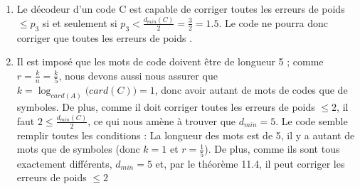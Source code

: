 \documentclass[10p,a4paper]{scrartcl}
\renewcommand{\(}{\left(}
\renewcommand{\)}{\right)}
\begin{document}
\begin{enumerate}
	\item 	Le décodeur d'un code C est capable de corriger toutes les erreurs de poids $\leq p_3$ si et seulement si $p_3 < \frac{d_{min}(C)}{2} = \frac{3}{2} = 1.5$. Le code ne pourra donc corriger que toutes les erreurs de poids .
	
	\item 	Il est imposé que les  mots de code doivent être de longueur 5 ; comme $r = \frac{k}{n} = \frac{k}{5}$, nous devons aussi nous assurer que $k = \log_{card(A)}\big(card(C)\big) = 1$, donc avoir autant de mots de codes que de symboles. De plus, comme il doit corriger toutes les erreurs de poids $\leq 2$, il faut $2 \leq \frac{d_{min}(C)}{2}$, ce qui nous amène à trouver que $d_{min} = 5$. Le code  semble remplir toutes les conditions : La longueur des mots est de 5, il y a autant de mots que de symboles (donc $k=1$ et $r = \frac{1}{5}$). De plus, comme ils sont tous exactement différents, $d_{min} = 5$ et, par le théorème 11.4, il peut corriger les erreurs de poids $\leq 2$
\end{enumerate}
\end{document}
